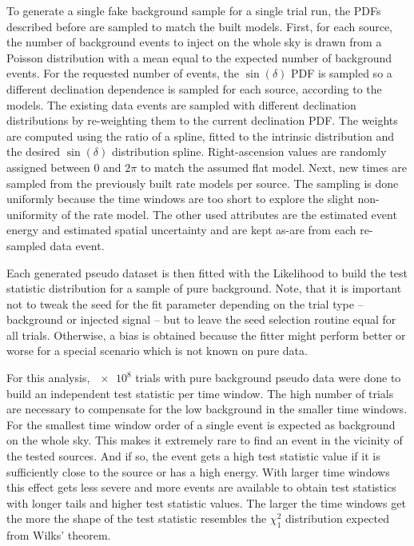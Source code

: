 To generate a single fake background sample for a single trial run, the PDFs described before are sampled to match the built models.
First, for each source, the number of background events to inject on the whole sky is drawn from a Poisson distribution with a mean equal to the expected number of background events.
For the requested number of events, the $\sin(\delta)$ PDF is sampled so a different declination dependence is sampled for each source, according to the models.
The existing data events are sampled with different declination distributions by re-weighting them to the current declination PDF.
The weights are computed using the ratio of a spline, fitted to the intrinsic distribution and the desired $\sin(\delta)$ distribution spline.
Right-ascension values are randomly assigned between $\num{0}$ and $2\pi$ to match the assumed flat model.
Next, new times are sampled from the previously built rate models per source.
The sampling is done uniformly because the time windows are too short to explore the slight non-uniformity of the rate model.
The other used attributes are the estimated event energy and estimated spatial uncertainty and are kept as-are from each re-sampled data event.

Each generated pseudo dataset is then fitted with the Likelihood to build the test statistic distribution for  a sample of pure background.
Note, that it is important not to tweak the seed for the fit parameter depending on the trial type – background or injected signal – but to leave the seed selection routine equal for all trials.
Otherwise, a bias is obtained because the fitter might perform better or worse for a special scenario which is not known on pure data.

For this analysis, $\num{e8}$ trials with pure background pseudo data were done to build an independent test statistic per time window.
The high number of trials are necessary to compensate for the low background in the smaller time windows.
For the smallest time window order of a single event is expected as background on the whole sky.
This makes it extremely rare to find an event in the vicinity of the tested sources.
And if so, the event gets a high test statistic value if it is sufficiently close to the source or has a high energy.
With larger time windows this effect gets less severe and more events are available to obtain test statistics with longer tails and higher test statistic values.
The larger the time windows get the more the shape of the test statistic resembles the $\chi^2_1$ distribution expected from Wilks' theorem.

